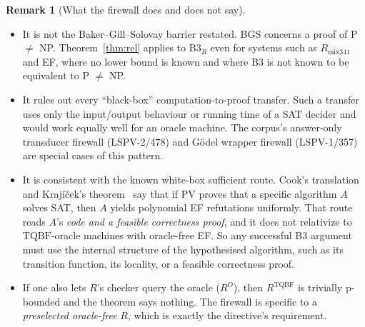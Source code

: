 \documentclass[11pt]{article}
\theoremstyle{definition}
\newtheorem{remark}[theorem]{Remark}
\begin{document}
\begin{remark}[What the firewall does and does not say]
\begin{itemize}
\item It is not the Baker--Gill--Solovay barrier restated. BGS concerns a proof of
P $\ne$ NP. Theorem~\ref{thm:rel} applies to $\mathrm{B3}_R$ even for systems such as
$R_{\mathrm{mix341}}$ and EF, where no lower bound is known and where B3 is not known to
be equivalent to P $\ne$ NP.
\item It rules out every ``black-box'' computation-to-proof transfer. Such a transfer
uses only the input/output behaviour or running time of a SAT decider and would work
equally well for an oracle machine. The corpus's answer-only transducer firewall
(LSPV-2/478) and Gödel wrapper firewall (LSPV-1/357) are special cases of this pattern.
\item It is consistent with the known white-box sufficient route. Cook's translation and
Krajíček's theorem~\cite{Cook75,Kra95} say that if PV proves that a specific algorithm
$A$ solves SAT, then $A$ yields polynomial EF refutations uniformly. That route reads
$A$'s \emph{code and a feasible correctness proof}, and it does not relativize to
$\mathrm{TQBF}$-oracle machines with oracle-free EF. So any successful B3 argument must
use the internal structure of the hypothesised algorithm, such as its transition
function, its locality, or a feasible correctness proof.
\item If one also lets $R$'s checker query the oracle ($R^O$), then
$R^{\mathrm{TQBF}}$ is trivially p-bounded and the theorem says nothing. The firewall is
specific to a \emph{preselected oracle-free} $R$, which is exactly the directive's
requirement.
\end{itemize}
\end{remark}
\end{document}
